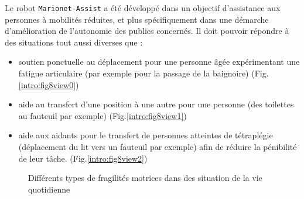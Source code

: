 Le robot {\tt Marionet-Assist} a été développé dans un objectif d'assistance 
aux 
personnes à mobilités réduites, et plus spécifiquement dans une démarche 
d'amélio\-ration de l'autonomie des publics concernés. Il doit pouvoir répondre 
à des situations tout aussi diverses que :
\begin{itemize}
 \item soutien ponctuelle au déplacement pour une personne âgée expérimentant 
une fatigue articulaire (par exemple pour la passage de la baignoire) 
(Fig.\ref{intro:fig8view0})
 \item aide au transfert d'une position à une autre pour une personne (des 
toilettes au fauteuil par exemple) 
(Fig.\ref{intro:fig8view1})
 \item aide aux aidants pour le transfert de personnes atteintes de 
tétraplégie (déplacement du lit vers un fauteuil par exemple) afin de r\'eduire 
la p\'enibilit\'e de leur t\^ache. 
(Fig.\ref{intro:fig8view2})
\end{itemize}

\begin{figure}[htp]
  \centering
   \hfill
   \hfill
   \hfill
    \caption{\footnotesize{Différents types de fragilités motrices dans des 
situation de la vie quotidienne}}
\label{intro:fig8}
\end{figure}

